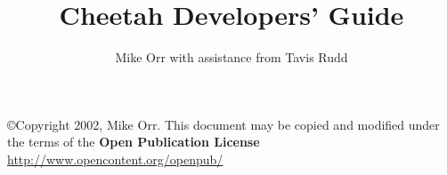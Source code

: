 \documentclass{howto}
\title{Cheetah Developers' Guide}
\author{Mike Orr with assistance from Tavis Rudd}
\begin{document}
\maketitle


\tableofcontents

\copyright{Copyright 2002, Mike Orr.
      This document may be copied and modified under the terms of the
      {\bf Open Publication License} \url{http://www.opencontent.org/openpub/} }


    

    
    
    
    
    
    
    
    
    

    
    
    
    

    
    
    
    
    
    \appendix
    
    
\end{document}
